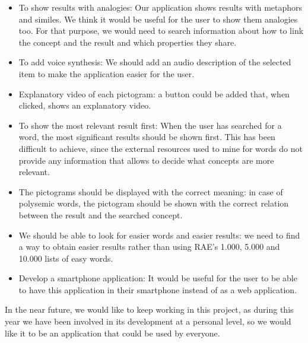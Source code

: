 \begin{itemize}
	\item To show results with analogies: Our application shows results with metaphors and similes. We think it would be useful for the user to show them analogies too. For that purpose, we would need to search information about how to link the concept and the result and which properties they share.
	
	\item To add voice synthesis: We should add an audio description of the selected item to make the application easier for the user.
	
	\item Explanatory video of each pictogram: a button could be added that, when clicked, shows an explanatory video.
	
	\item To show the most relevant result first: When the user has searched for a word, the most significant results should be shown first. This has been difficult to achieve, since the external resources used to mine for words do not provide any information that allows to decide what concepts are more relevant.
	
	\item The pictograms should be displayed with the correct meaning: in case of polysemic words, the pictogram should be shown with the correct relation between the result and the searched concept.
	
	\item We should be able to look for easier words and easier results: we need to find a way to obtain easier results rather than using RAE's 1.000, 5.000 and 10.000 lists of easy words.
	
	\item Develop a smartphone application: It would be useful for the user to be able to have this application in their smartphone instead of as a web application.
	
\end{itemize}

In the near future, we would like to keep working in this project, as during this year we have been involved in its development at a personal level, so we would like it to be an application that could be used by everyone.




